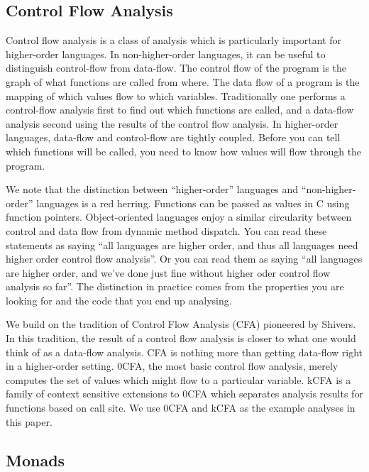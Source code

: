 \documentclass{article}
\begin{document}

\subsection{Control Flow Analysis}
\label{CFA}

Control flow analysis is a class of analysis which is particularly important for higher-order languages.
In non-higher-order languages, it can be useful to distinguish control-flow from data-flow.
The control flow of the program is the graph of what functions are called from where.
The data flow of a program is the mapping of which values flow to which variables.
Traditionally one performs a control-flow analysis first to find out which functions are called, 
  and a data-flow analysis second using the results of the control flow analysis.
In higher-order languages, data-flow and control-flow are tightly coupled.
Before you can tell which functions will be called, you need to know how values will flow through the program.

We note that the distinction between “higher-order” languages and “non-higher-order” languages is a red herring.
Functions can be passed as values in C using function pointers.
Object-oriented languages enjoy a similar circularity between control and data flow from dynamic method dispatch.
You can read these statements as saying “all languages are higher order, and thus all languages need higher order control flow analysis”.
Or you can read them as saying “all languages are higher order, and we've done just fine without higher oder control flow analysis so far”.
The distinction in practice comes from the properties you are looking for and the code that you end up analysing.

We build on the tradition of Control Flow Analysis (CFA) pioneered by Shivers\cite{shivers:1991:cfa}.
In this tradition, the result of a control flow analysis is closer to what one would think of as a data-flow analysis.
CFA is nothing more than getting data-flow right in a higher-order setting.
0CFA, the most basic control flow analysis, merely computes the set of values which might flow to a particular variable.
kCFA is a family of context sensitive extensions to 0CFA which separates analysis results for functions based on call site.
We use 0CFA and kCFA as the example analyses in this paper.


\subsection{Monads}
\label{Monads}
\end{document}

